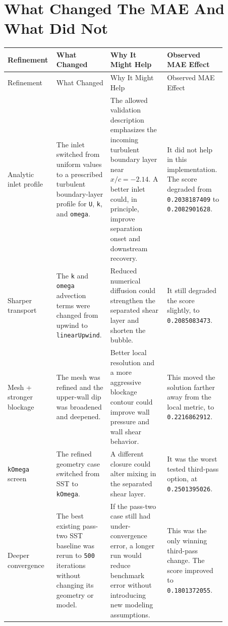 \documentclass[11pt]{article}
\begin{document}
\section{What Changed The MAE And What Did Not}
\small
\begin{longtable}{p{0.16\linewidth} p{0.20\linewidth} p{0.25\linewidth} p{0.25\linewidth}}
\toprule
Refinement & What Changed & Why It Might Help & Observed MAE Effect \\
\midrule
\endfirsthead
\toprule
Refinement & What Changed & Why It Might Help & Observed MAE Effect \\
\midrule
\endhead
Analytic inlet profile & The inlet switched from uniform values to a prescribed turbulent boundary-layer profile for \texttt{U}, \texttt{k}, and \texttt{omega}. & The allowed validation description emphasizes the incoming turbulent boundary layer near \(x/c=-2.14\). A better inlet could, in principle, improve separation onset and downstream recovery. & It did not help in this implementation. The score degraded from \texttt{0.2038187409} to \texttt{0.2082901628}. \\
Sharper transport & The \texttt{k} and \texttt{omega} advection terms were changed from upwind to \texttt{linearUpwind}. & Reduced numerical diffusion could strengthen the separated shear layer and shorten the bubble. & It still degraded the score slightly, to \texttt{0.2085083473}. \\
Mesh + stronger blockage & The mesh was refined and the upper-wall dip was broadened and deepened. & Better local resolution and a more aggressive blockage contour could improve wall pressure and wall shear behavior. & This moved the solution farther away from the local metric, to \texttt{0.2216862912}. \\
\texttt{kOmega} screen & The refined geometry case switched from SST to \texttt{kOmega}. & A different closure could alter mixing in the separated shear layer. & It was the worst tested third-pass option, at \texttt{0.2501395026}. \\
Deeper convergence & The best existing pass-two SST baseline was rerun to \texttt{500} iterations without changing its geometry or model. & If the pass-two case still had under-convergence error, a longer run would reduce benchmark error without introducing new modeling assumptions. & This was the only winning third-pass change. The score improved to \texttt{0.1801372055}. \\
\bottomrule
\end{longtable}
\normalsize
\end{document}
